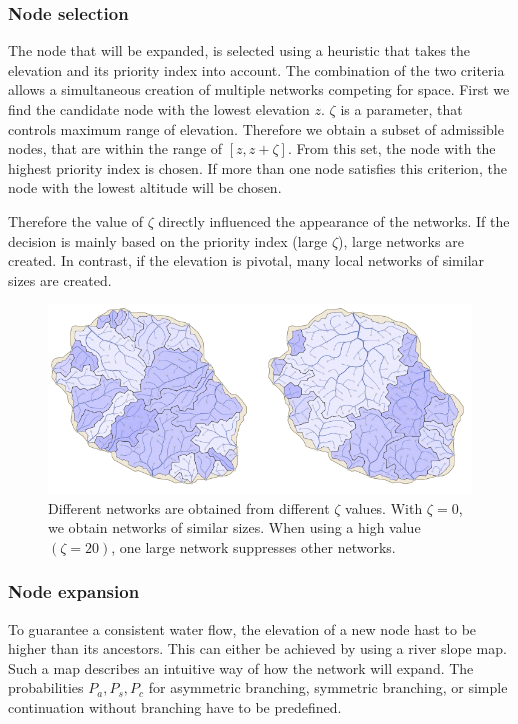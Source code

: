 \subsubsection{Node selection}
The node that will be expanded, is selected using a heuristic that takes the elevation and its priority index into account. The combination of the two criteria allows a simultaneous creation of multiple networks competing for space. 
First we find the candidate node with the lowest elevation $z$. 
$\zeta $ is a parameter, that controls maximum range of elevation. Therefore we obtain a subset of admissible nodes, that are within the range of $[z, z + \zeta]$. From this set, the node with the highest priority index is chosen. If more than one node satisfies this criterion, the node with the lowest altitude will be chosen. 

Therefore the value of $\zeta$ directly influenced the appearance of the networks. If the decision is mainly based on the priority index (large $\zeta$), large networks are created. In contrast, if the elevation is pivotal, many local networks of similar sizes are created.

\begin{figure}[htb]
	\centering
	\includegraphics[width=\linewidth]{GGG13/drainage_system}
	\caption{Different networks are obtained from different $\zeta$ values. With $\zeta = 0$, we obtain networks of similar sizes. When using a high value $(\zeta = 20)$, one large network suppresses other networks. }
	\label{fig:dif_networks}
\end{figure}

\subsubsection{Node expansion}
To guarantee a consistent water flow, the elevation of a new node hast to be higher than its ancestors. This can either be achieved by using a river slope map. Such a map describes an intuitive way of how the network will expand. The probabilities $P_a, P_s, P_c$ for asymmetric branching, symmetric branching, or simple continuation without branching have to be predefined. 

